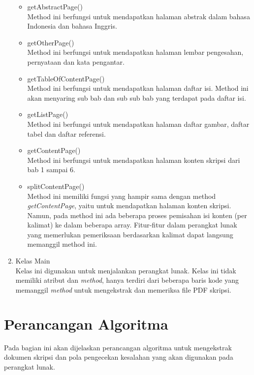 \begin{enumerate}
\begin{itemize}
			\item getAbstractPage() \\
			Method ini berfungsi untuk mendapatkan halaman abstrak dalam bahasa Indonesia dan bahasa Inggris.
			
			\item getOtherPage() \\
			Method ini berfungsi untuk mendapatkan halaman lembar pengesahan, pernyataan dan kata pengantar.
			
			\item getTableOfContentPage() \\
			Method ini berfungsi untuk mendapatkan halaman daftar isi. Method ini akan menyaring sub bab dan sub sub bab yang terdapat pada daftar isi.
			
			\item getListPage() \\
			Method ini berfungsi untuk mendapatkan halaman daftar gambar, daftar tabel dan daftar referensi.
			
			\item getContentPage() \\
			Method ini berfungsi untuk mendapatkan halaman konten skripsi dari bab 1 sampai 6.
			
			\item splitContentPage() \\
			Method ini memiliki fungsi yang hampir sama dengan method \textit{getContentPage}, yaitu untuk mendapatkan halaman konten skripsi. Namun, pada method ini ada beberapa proses pemisahan isi konten (per kalimat) ke dalam beberapa array. Fitur-fitur dalam perangkat lunak yang memerlukan pemeriksaan berdasarkan kalimat dapat langsung memanggil method ini. 
			
		\end{itemize}
	
	\item Kelas Main \\
	Kelas ini digunakan untuk menjalankan perangkat lunak. Kelas ini tidak memiliki atribut dan \textit{method}, hanya terdiri dari beberapa baris kode yang memanggil \textit{method} untuk mengekstrak dan memeriksa file PDF skripsi. 

\end{enumerate} 

\section{Perancangan Algoritma}
Pada bagian ini akan dijelaskan perancangan algoritma untuk mengekstrak dokumen skripsi dan pola pengecekan kesalahan yang akan digunakan pada perangkat lunak.
 
